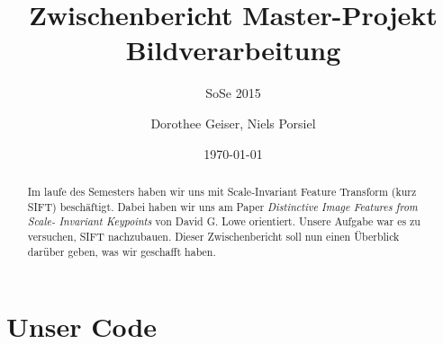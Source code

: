 \documentclass[a4paper,12pt]{scrartcl}
\title{Zwischenbericht Master-Projekt Bildverarbeitung}
\subtitle{SoSe 2015}
\author{Dorothee Geiser, Niels Porsiel}
\date{\today}
\begin{document}
\maketitle
\thispagestyle{empty}
\vspace{0.3\textheight}

\begin{abstract}
Im laufe des Semesters haben wir uns mit Scale-Invariant Feature Transform (kurz SIFT)
beschäftigt. Dabei haben wir uns am Paper \textit{Distinctive Image Features from Scale-
Invariant Keypoints} von David G. Lowe \cite{Lowe} orientiert. Unsere Aufgabe war es zu 
versuchen, SIFT nachzubauen. Dieser Zwischenbericht soll nun einen Überblick darüber 
geben, was wir geschafft haben.
\end{abstract}

\newpage
\tableofcontents
\newpage

\section{Unser Code}
\end{document}

